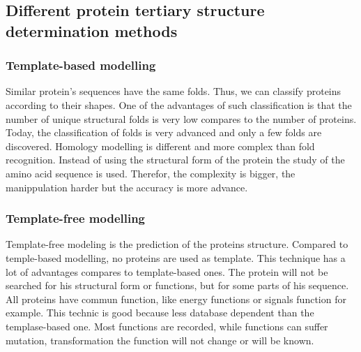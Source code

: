 \subsection{Different protein tertiary structure determination methods} 
\subsubsection{Template-based modelling}
Similar protein's sequences have the same folds. Thus, we can classify proteins according to their shapes. One of the advantages of such classification is that the number of unique structural folds is very low compares to the number of proteins.
\newline
Today, the classification of folds is very advanced and only a few folds are discovered.
Homology modelling is different and more complex than fold recognition. Instead of using the structural form of the protein the study of the amino acid sequence is used. Therefor, the complexity is bigger, the manippulation harder but the accuracy is more advance.

\subsubsection{Template-free modelling}
Template-free modeling is the prediction of the proteins structure. Compared to temple-based modelling, no proteins are used as template. 
\newline This technique has a lot of advantages compares to template-based ones. The protein will not be searched for his structural form or functions, but for some parts of his sequence. All proteins have commun function,  like energy functions or signals function for example. This technic is good because less database dependent than the templase-based one. Most functions are recorded, while functions can suffer mutation, transformation the function will not change or will be known.


